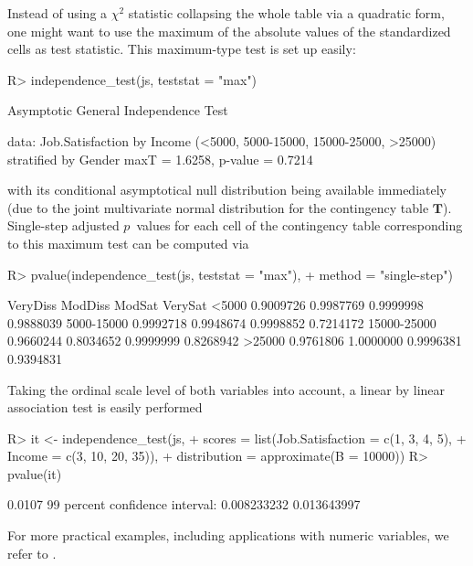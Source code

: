 \documentclass{Z}
\newcommand{\T}{\mathbf{T}}
\begin{document}
Instead of using a $\chi^2$ statistic collapsing the whole table via a quadratic form, one might
want to use the maximum of the absolute values of the standardized cells as test statistic.
This maximum-type test is set up  easily:
\begin{Schunk}
\begin{Sinput}
R> independence_test(js, teststat = "max")
\end{Sinput}
\begin{Soutput}
	Asymptotic General Independence Test

data:  Job.Satisfaction by
	 Income (<5000, 5000-15000, 15000-25000, >25000) 
	 stratified by Gender 
maxT = 1.6258, p-value = 0.7214
\end{Soutput}
\end{Schunk}
with its conditional asymptotical null distribution being 
available immediately (due to the joint multivariate normal distribution
for the contingency table $\T$). Single-step adjusted $p$~values for each
cell of the contingency table corresponding to this maximum test
can be computed via
\begin{Schunk}
\begin{Sinput}
R> pvalue(independence_test(js, teststat = "max"), 
+        method = "single-step")
\end{Sinput}
\begin{Soutput}
             VeryDiss   ModDiss    ModSat   VerySat
<5000       0.9009726 0.9987769 0.9999998 0.9888039
5000-15000  0.9992718 0.9948674 0.9998852 0.7214172
15000-25000 0.9660244 0.8034652 0.9999999 0.8268942
>25000      0.9761806 1.0000000 0.9996381 0.9394831
\end{Soutput}
\end{Schunk}
Taking the ordinal scale level of both
variables into account, a linear by linear association test \citep{agresti2002}
is easily performed
\begin{Schunk}
\begin{Sinput}
R> it <- independence_test(js, 
+     scores = list(Job.Satisfaction = c(1, 3, 4, 5),
+                   Income = c(3, 10, 20, 35)),
+     distribution = approximate(B = 10000))
R> pvalue(it)
\end{Sinput}
\begin{Soutput}
[1] 0.0107
99 percent confidence interval:
 0.008233232 0.013643997 
\end{Soutput}
\end{Schunk}
For more practical examples, including applications with numeric variables, 
we refer to \cite{Hothorn:2006:AmStat}.
\end{document}
